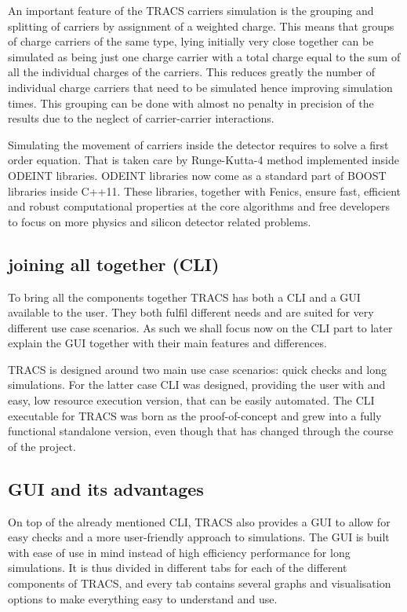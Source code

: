 An important feature of the TRACS carriers simulation is the grouping and splitting of carriers by assignment of a weighted charge. This means that groups of charge carriers  of the same type, lying initially very close together can be simulated as being just one charge carrier with a total charge equal to the sum of all the individual charges of the carriers. This reduces greatly the number of individual charge carriers that need to be simulated hence improving simulation times. This grouping can be done with almost no penalty in precision of the results due to the neglect of carrier-carrier interactions.

Simulating the movement of carriers inside the detector requires to solve a first order equation. That is taken care by Runge-Kutta-4 method implemented inside ODEINT libraries. ODEINT libraries now come as a standard part of BOOST libraries inside C++11. These libraries, together with Fenics, ensure fast, efficient and robust computational properties at the core algorithms and free developers to focus on more physics and silicon detector related problems.



\subsection{joining all together (CLI)}

To bring all the components together TRACS has both a CLI and a GUI available to the user. They both fulfil different needs and are suited for very different use case scenarios. As such we shall focus now on the CLI part to later explain the GUI together with their main features and differences.

TRACS is designed around two main use case scenarios: quick checks and long simulations. For the latter case CLI was designed, providing the user with and easy, low resource execution version, that can be easily automated. The CLI executable for TRACS was born as the proof-of-concept and grew into a fully functional standalone version, even though that has changed through the course of the project.

\subsection{GUI and its advantages}

On top of the already mentioned CLI, TRACS also provides a GUI to allow for easy checks and a more user-friendly approach to simulations. The GUI is built with ease of use in mind instead of high efficiency performance for long simulations. It is thus divided in different tabs for each of the different components of TRACS, and every tab contains several graphs and visualisation options to make everything easy to understand and use.

